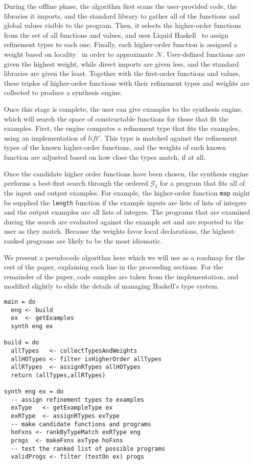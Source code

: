 During the offline phase, the algorithm first scans the user-provided code, the libraries it imports, and the standard library to gather all of the functions and global values visible to the program. Then, it selects the higher-order functions from the set of all functions and values, and uses Liquid Haskell~\cite{DBLP:conf/haskell/VazouSJ14, DBLP:conf/esop/VazouRJ13, DBLP:conf/icfp/VazouSJVJ14} to assign refinement types to each one. Finally, each higher-order function is assigned a weight based on locality~\cite{DBLP:conf/pldi/GveroKKP13} in order to approximate $\mathcal{N}$. User-defined functions are given the highest weight, while direct imports are given less, and the standard libraries are given the least. Together with the first-order functions and values, these triples of higher-order functions with their refinement types and weights are collected to produce a synthesis engine.

Once this stage is complete, the user can  give examples to the synthesis engine, which will search the space of constructable functions for those that fit the examples.
First, the engine computes a refinement type that fits the examples, using an implementation of $lift'$.
This type is matched against the refinement types of the known higher-order functions, and the weights of each known function are adjusted based on how close the types match, if at all.

Once the candidate higher order functions have been chosen, the synthesis engine performs a best-first search through the ordered $\mathcal{G}_I$ for a program that fits all of the input and output examples.
For example, the higher-order function \texttt{map} might be supplied the \texttt{length} function if the example inputs are lists of lists of integers and the output examples are all lists of integers. 
The programs that are examined during the search are evaluated against the example set and are reported to the user as they match. 
Because the weights favor local declarations, the highest-ranked programs are likely to be the most idiomatic.

We present a pseudocode algorithm here which we will use as a roadmap for the rest of the paper, explaining each line in the proceeding sections. For the remainder of the paper, code samples are taken from the implementation, and modified slightly to elide the details of managing Haskell's type system.

\begin{lstlisting}[caption=A pseudocode representation of the build and synthesis stages of the synthesis algorithm, label=listing:Algo]
main = do
  eng <- build
  ex  <- getExamples
  synth eng ex

build = do
  allTypes   <- collectTypesAndWeights
  allHOTypes <- filter isHigherOrder allTypes
  allRTypes  <- assignRTypes allHOTypes
  return (allTypes,allRTypes)

synth eng ex = do
  -- assign refinement types to examples
  exType   <- getExampleType ex
  exRType  <- assignRTypes exType
  -- make candidate functions and programs
  hoFxns <- rankByTypeMatch exRType eng
  progs  <- makeFxns exType hoFxns
  -- test the ranked list of possible programs
  validProgs <- filter (testOn ex) progs
\end{lstlisting}
